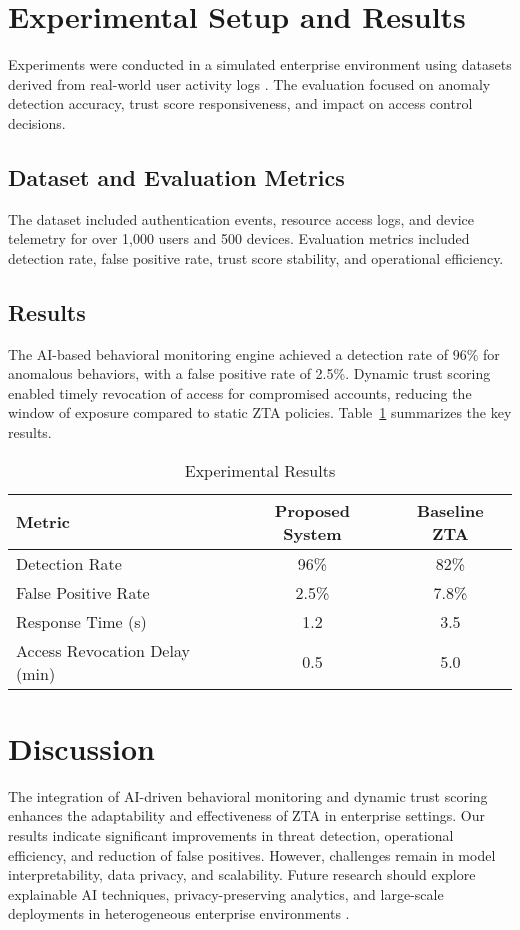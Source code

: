 \documentclass[conference]{IEEEtran}
\begin{document}
\section{Experimental Setup and Results}
Experiments were conducted in a simulated enterprise environment using datasets derived from real-world user activity logs \cite{paper8,paper13}. The evaluation focused on anomaly detection accuracy, trust score responsiveness, and impact on access control decisions.

\subsection{Dataset and Evaluation Metrics}
The dataset included authentication events, resource access logs, and device telemetry for over 1,000 users and 500 devices. Evaluation metrics included detection rate, false positive rate, trust score stability, and operational efficiency.

\subsection{Results}
The AI-based behavioral monitoring engine achieved a detection rate of 96\% for anomalous behaviors, with a false positive rate of 2.5\%. Dynamic trust scoring enabled timely revocation of access for compromised accounts, reducing the window of exposure compared to static ZTA policies. Table~\ref{tab:results} summarizes the key results.

\begin{table}[ht]
    \centering
    \caption{Experimental Results}
    \begin{tabular}{|l|c|c|}
        \hline
        Metric & Proposed System & Baseline ZTA \\
        \hline
        Detection Rate & 96\% & 82\% \\
        False Positive Rate & 2.5\% & 7.8\% \\
        Response Time (s) & 1.2 & 3.5 \\
        Access Revocation Delay (min) & 0.5 & 5.0 \\
        \hline
    \end{tabular}
    \label{tab:results}
\end{table}


\section{Discussion}
The integration of AI-driven behavioral monitoring and dynamic trust scoring enhances the adaptability and effectiveness of ZTA in enterprise settings. Our results indicate significant improvements in threat detection, operational efficiency, and reduction of false positives. However, challenges remain in model interpretability, data privacy, and scalability. Future research should explore explainable AI techniques, privacy-preserving analytics, and large-scale deployments in heterogeneous enterprise environments \cite{paper14,paper15}.
\end{document}
